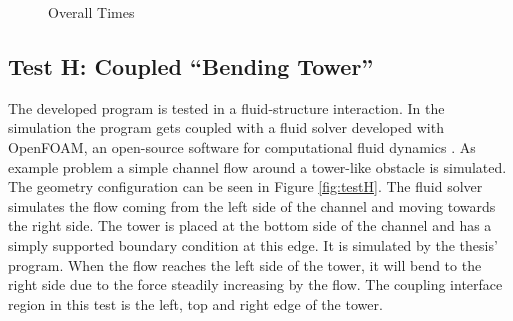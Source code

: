    \begin{figure}[htbp]
   	\centering
   	\caption{Overall Times}
   	\label{fig:overall-times}
   \end{figure}
 \subsection{Test H: Coupled ``Bending Tower''}\label{sec:valid-H}
  The developed program is tested in a fluid-structure interaction. In the simulation the program gets coupled with a fluid solver developed with OpenFOAM, an open-source software for computational fluid dynamics \cite{openfoam-url}. As example problem a simple channel flow around a tower-like obstacle is simulated. The geometry configuration can be seen in Figure \ref{fig:testH}. The fluid solver simulates the flow coming from the left side of the channel and moving towards the right side. The tower is placed at the bottom side of the channel and has a simply supported boundary condition at this edge. It is simulated by the thesis' program. When the flow reaches the left side of the tower, it will bend to the right side due to the force steadily increasing by the flow. The coupling interface region in this test is the left, top and right edge of the tower.
  
